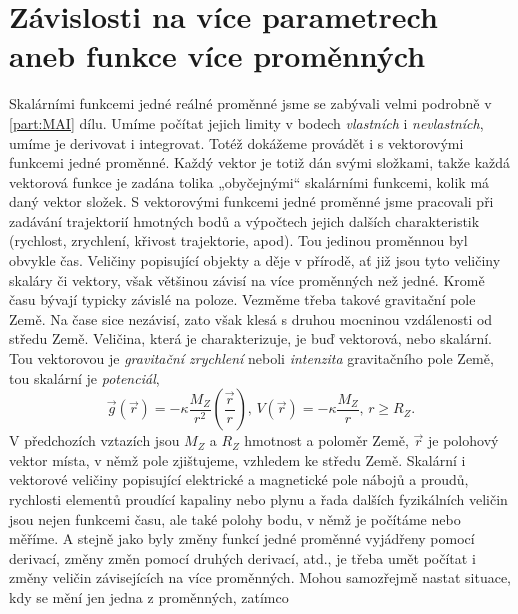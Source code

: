 \setchaptertoc
\chapter{Závislosti na více parametrech aneb funkce více proměnných}\label{mai:IIchapVI}
  Skalárními funkcemi jedné reálné proměnné jsme se zabývali velmi podrobně v \ref{part:MAI} dílu.
  Umíme počítat jejich limity v bodech \emph{vlastních} i \emph{nevlastních}, umíme je derivovat i
  integrovat. Totéž dokážeme provádět i s vektorovými funkcemi jedné proměnné. Každý vektor je totiž
  dán svými složkami, takže každá vektorová funkce je zadána tolika „obyčejnými“ skalárními
  funkcemi, kolik má daný vektor složek. S vektorovými funkcemi jedné proměnné jsme pracovali při
  zadávání trajektorií hmotných bodů a výpočtech jejich dalších charakteristik (rychlost, zrychlení,
  křivost trajektorie, apod). Tou jedinou proměnnou byl obvykle čas. Veličiny popisující objekty a
  děje v přírodě, ať již jsou tyto veličiny skaláry či vektory, však většinou závisí na více
  proměnných než jedné. Kromě času bývají typicky závislé na poloze. Vezměme třeba takové gravitační
  pole Země. Na čase sice nezávisí, zato však klesá s druhou mocninou vzdálenosti od středu Země.
  Veličina, která je charakterizuje, je buď vektorová, nebo skalární. Tou vektorovou je
  \emph{gravitační zrychlení} neboli \emph{intenzita} gravitačního pole Země, tou skalární je
  \emph{potenciál},
  \begin{equation*}
    \vec{g}(\vec{r}) = - \kappa\dfrac{M_Z}{r^2}\left(\dfrac{\vec{r}}{r}\right),\,
    V(\vec{r}) = -\kappa\dfrac{M_Z}{r}, \, r\geq R_Z.
  \end{equation*}
  V předchozích vztazích jsou \(M_Z\) a \(R_Z\) hmotnost a poloměr Země, \(\vec{r}\) je polohový
  vektor místa, v němž pole zjištujeme, vzhledem ke středu Země. Skalární i vektorové veličiny
  popisující elektrické a magnetické pole nábojů a proudů, rychlosti elementů proudící kapaliny nebo
  plynu a řada dalších fyzikálních veličin jsou nejen funkcemi času, ale také polohy bodu, v němž je
  počítáme nebo měříme. A stejně jako byly změny funkcí jedné proměnné vyjádřeny pomocí derivací,
  změny změn pomocí druhých derivací, atd., je třeba umět počítat i změny veličin závisejících na
  více proměnných. Mohou samozřejmě nastat situace, kdy se mění jen jedna z proměnných, zatímco
